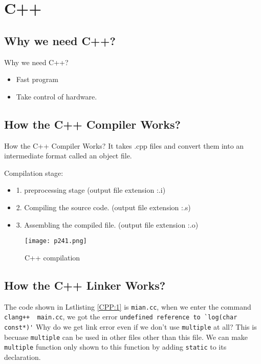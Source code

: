 \newpage
\section{C++}


\subsection{Why we need C++?}

\begin{question}{Why we need C++?}
	\begin{itemize}
		\item Fast program
		\item Take control of hardware.
	\end{itemize}
\end{question}


\subsection{How the C++ Compiler Works?}
\begin{question}{How the C++ Compiler Works?}
	It takes .cpp files and convert them into an intermediate format
	called an object file.

	Compilation stage:
	\begin{itemize}
		\item     1. preprocessing stage (output file extension :.i)
		\item     2. Compiling the source code. (output file extension :.s)
		\item     3. Assembling the compiled file. (output file extension :.o)
	\end{itemize}


	\begin{figure}[H]
		\centering
		\texttt{[image: p241.png]}
		\caption{C++ compilation}
		\label{fig:p241}
	\end{figure}

\end{question}




\subsection{How the C++ Linker Works?}
The code shown in Lstlisting \ref{CPP:1} is \verb|mian.cc|, when we enter the command \verb|clang++  main.cc|, we got the error {\color{red}\verb|undefined reference to `log(char const*)'|}
Why do we get link error even if we don't use \verb|multiple| at all? This is becuase \verb|multiple| can be used in other files other than this file. 
We can make \verb|multiple| function only shown to this function by adding \verb|static| to its declaration.

